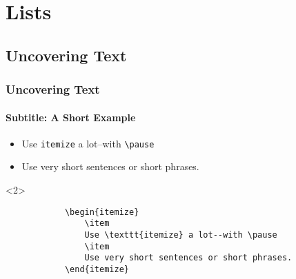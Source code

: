 \section{Lists}

\subsection{Uncovering Text}
\begin{frame}[fragile]
	\frametitle{Uncovering Text}
	\framesubtitle{Subtitle: A Short Example}
	
	\begin{itemize}
		\item
		Use \texttt{itemize} a lot--with \verb+\pause+\pause
		\item
		Use very short sentences or short phrases.
	\end{itemize}
	
	\begin{uncoverenv}
		\begin{verbatim}
			\begin{itemize}
				\item
				Use \texttt{itemize} a lot--with \pause
				\item
				Use very short sentences or short phrases.
			\end{itemize}
		\end{verbatim}
	\end{uncoverenv}
\end{frame}


